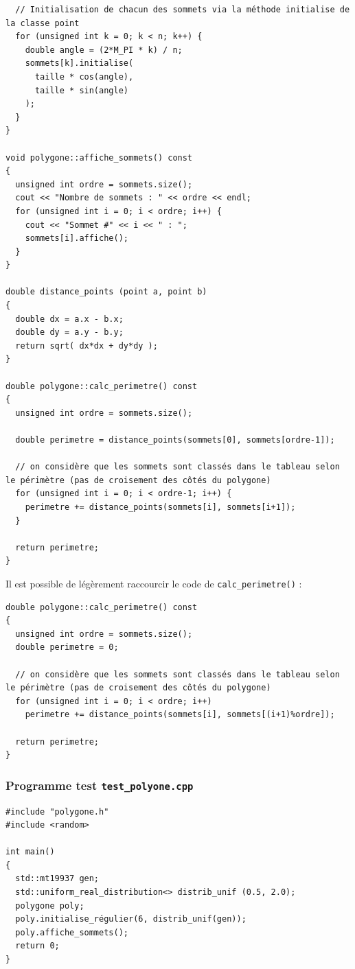 \documentclass{book}
\newcommand{\inline}[1]{\texttt{#1}}
\begin{document}
\begin{correction}
\begin{verbatim}
  // Initialisation de chacun des sommets via la méthode initialise de la classe point
  for (unsigned int k = 0; k < n; k++) {
    double angle = (2*M_PI * k) / n;
    sommets[k].initialise(
      taille * cos(angle),
      taille * sin(angle)
    );
  }
}

void polygone::affiche_sommets() const
{
  unsigned int ordre = sommets.size();
  cout << "Nombre de sommets : " << ordre << endl;
  for (unsigned int i = 0; i < ordre; i++) {
    cout << "Sommet #" << i << " : ";
    sommets[i].affiche();
  }
}

double distance_points (point a, point b)
{
  double dx = a.x - b.x;
  double dy = a.y - b.y;
  return sqrt( dx*dx + dy*dy );
}

double polygone::calc_perimetre() const
{
  unsigned int ordre = sommets.size();

  double perimetre = distance_points(sommets[0], sommets[ordre-1]);

  // on considère que les sommets sont classés dans le tableau selon le périmètre (pas de croisement des côtés du polygone)
  for (unsigned int i = 0; i < ordre-1; i++) {
    perimetre += distance_points(sommets[i], sommets[i+1]);
  }

  return perimetre;
}
\end{verbatim}

Il est possible de légèrement raccourcir le code de \inline{calc_perimetre()} :
\begin{verbatim}
double polygone::calc_perimetre() const
{
  unsigned int ordre = sommets.size();
  double perimetre = 0;

  // on considère que les sommets sont classés dans le tableau selon le périmètre (pas de croisement des côtés du polygone)
  for (unsigned int i = 0; i < ordre; i++)
    perimetre += distance_points(sommets[i], sommets[(i+1)%ordre]);

  return perimetre;
}
\end{verbatim}

\subsubsection*{Programme test \texttt{test\_polyone.cpp}}
\begin{verbatim}
#include "polygone.h"
#include <random>

int main()
{
  std::mt19937 gen;
  std::uniform_real_distribution<> distrib_unif (0.5, 2.0);
  polygone poly;
  poly.initialise_régulier(6, distrib_unif(gen));
  poly.affiche_sommets();
  return 0;
}
\end{verbatim}


\end{correction}
\end{document}
